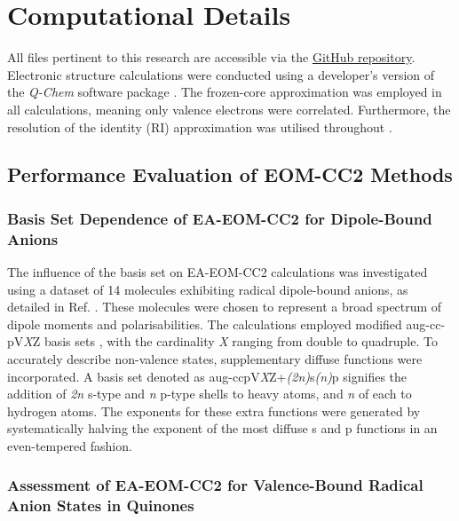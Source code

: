 \chapter{Computational Details}\label{ch:methods}

All files pertinent to this research are accessible via the \href{https://github.com/EliteSushi/TCCM_Thesis}{GitHub repository}. Electronic structure calculations were conducted using a developer's version of the \textit{Q-Chem} software package \cite{QChem5}. The frozen-core approximation was employed in all calculations, meaning only valence electrons were correlated. Furthermore, the resolution of the identity (RI) approximation was utilised throughout \cite{hattig2000cc2}.\\

\section{Performance Evaluation of EOM-CC2 Methods}

\subsection{Basis Set Dependence of EA-EOM-CC2 for Dipole-Bound Anions} \label{sec:methods:basis}

The influence of the basis set on EA-EOM-CC2 calculations was investigated using a dataset of 14 molecules exhibiting radical dipole-bound anions, as detailed in Ref. . These molecules were chosen to represent a broad spectrum of dipole moments and polarisabilities. The calculations employed modified aug-cc-pV\textit{X}Z basis sets \cite{dunning1989gaussian}, with the cardinality \textit{X} ranging from double to quadruple. To accurately describe non-valence states, supplementary diffuse functions were incorporated. A basis set denoted as aug-ccpV\textit{X}Z+\textit{(2n)}s\textit{(n)}p signifies the addition of \textit{2n} s-type and \textit{n} p-type shells to heavy atoms, and \textit{n} of each to hydrogen atoms. The exponents for these extra functions were generated by systematically halving the exponent of the most diffuse s and p functions in an even-tempered fashion. \\

\subsection{Assessment of EA-EOM-CC2 for Valence-Bound Radical Anion States in Quinones}

